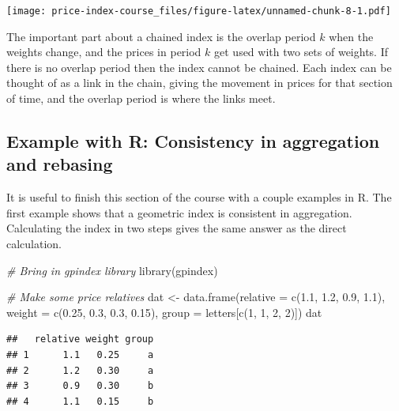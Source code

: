 \documentclass[
]{article}
\newenvironment{Shaded}{\begin{snugshade}}{\end{snugshade}}
\newcommand{\AttributeTok}[1]{\textcolor[rgb]{0.77,0.63,0.00}{#1}}
\newcommand{\CommentTok}[1]{\textcolor[rgb]{0.56,0.35,0.01}{\textit{#1}}}
\newcommand{\ControlFlowTok}[1]{\textcolor[rgb]{0.13,0.29,0.53}{\textbf{#1}}}
\newcommand{\DecValTok}[1]{\textcolor[rgb]{0.00,0.00,0.81}{#1}}
\newcommand{\FloatTok}[1]{\textcolor[rgb]{0.00,0.00,0.81}{#1}}
\newcommand{\FunctionTok}[1]{\textcolor[rgb]{0.00,0.00,0.00}{#1}}
\newcommand{\NormalTok}[1]{#1}
\newcommand{\OtherTok}[1]{\textcolor[rgb]{0.56,0.35,0.01}{#1}}
\newcommand{\SpecialCharTok}[1]{\textcolor[rgb]{0.00,0.00,0.00}{#1}}
\begin{document}
\texttt{[image: price-index-course\_files/figure-latex/unnamed-chunk-8-1.pdf]}

The important part about a chained index is the overlap period \(k\) when the weights change, and the prices in period \(k\) get used with two sets of weights. If there is no overlap period then the index cannot be chained. Each index can be thought of as a link in the chain, giving the movement in prices for that section of time, and the overlap period is where the links meet.

\hypertarget{example-with-r-consistency-in-aggregation-and-rebasing}{%
\subsection{Example with R: Consistency in aggregation and rebasing}\label{example-with-r-consistency-in-aggregation-and-rebasing}}

It is useful to finish this section of the course with a couple examples in R. The first example shows that a geometric index is consistent in aggregation. Calculating the index in two steps gives the same answer as the direct calculation.

\begin{Shaded}
\begin{Highlighting}[]
\CommentTok{\# Bring in gpindex library}
\FunctionTok{library}\NormalTok{(gpindex)}

\CommentTok{\# Make some price relatives}
\NormalTok{dat }\OtherTok{\textless{}{-}} \FunctionTok{data.frame}\NormalTok{(}\AttributeTok{relative =} \FunctionTok{c}\NormalTok{(}\FloatTok{1.1}\NormalTok{, }\FloatTok{1.2}\NormalTok{, }\FloatTok{0.9}\NormalTok{, }\FloatTok{1.1}\NormalTok{),}
                  \AttributeTok{weight =} \FunctionTok{c}\NormalTok{(}\FloatTok{0.25}\NormalTok{, }\FloatTok{0.3}\NormalTok{, }\FloatTok{0.3}\NormalTok{, }\FloatTok{0.15}\NormalTok{),}
                  \AttributeTok{group =}\NormalTok{ letters[}\FunctionTok{c}\NormalTok{(}\DecValTok{1}\NormalTok{, }\DecValTok{1}\NormalTok{, }\DecValTok{2}\NormalTok{, }\DecValTok{2}\NormalTok{)])}
\NormalTok{dat}
\end{Highlighting}
\end{Shaded}

\begin{verbatim}
##   relative weight group
## 1      1.1   0.25     a
## 2      1.2   0.30     a
## 3      0.9   0.30     b
## 4      1.1   0.15     b
\end{verbatim}

\begin{Shaded}
\end{Shaded}
\end{document}
